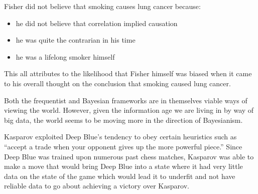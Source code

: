 \documentclass[12pt]{article}
\begin{document}
\begin{enumerate}

\begin{tcolorbox}[colback=white, sharp corners]
Fisher did not believe that smoking causes lung cancer because: 
\begin{itemize}
\item he did not believe that correlation implied causation
\item he was quite the contrarian in his time
\item he was a lifelong smoker himself
\end{itemize}
This all attributes to the likelihood that Fisher himself was biased when it came to his overall thought on the conclusion that smoking caused lung cancer. 
\end{tcolorbox}



\begin{tcolorbox}[colback=white, sharp corners]
Both the frequentist and Bayesian frameworks are in themselves viable ways of viewing the world. However, given the information age we are living in by way of big data, the world seems to be moving more in the direction of Bayesianism. 
\end{tcolorbox}



\begin{tcolorbox}[colback=white, sharp corners]
Kasparov exploited Deep Blue's tendency to obey certain heuristics such as ``accept a trade when your opponent gives up the more powerful piece.'' Since Deep Blue was trained upon numerous past chess matches, Kasparov was able to make a move that would bring Deep Blue into a state where it had very little data on the state of the game which would lead it to underfit and not have reliable data to go about achieving a victory over Kasparov. 
\end{tcolorbox}



\end{enumerate}
\end{document}
